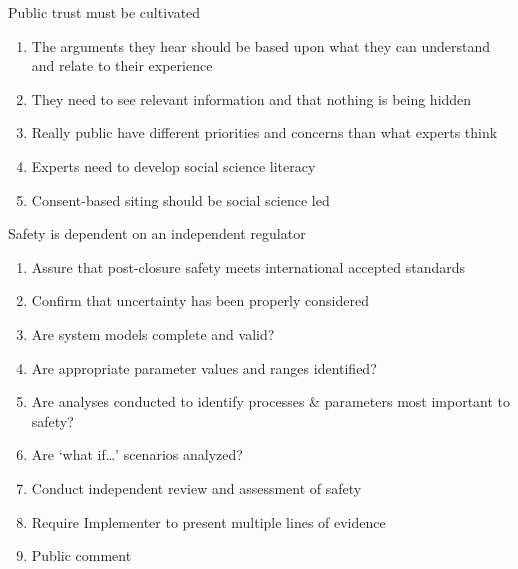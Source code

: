 \documentclass[aspectratio=1610,pdftex,dvipsnames,compress,xcolor={dvipsnames}]{beamer}
\begin{document}
\begin{frame}{Public trust must be cultivated}
    \begin{enumerate}[series=outerlist,topsep=0pt,itemsep=21pt,leftmargin=*,label=(\arabic*)]
        \item[]The arguments they hear should be based upon what they can understand and relate to their experience
        \item[]They need to see relevant information and that nothing is being hidden
        \item[]Really public have different priorities and concerns than what experts think
        \item[]Experts need to develop social science literacy
        \item[]Consent-based siting should be social science led
    \end{enumerate}
\end{frame}


\begin{frame}{Safety is dependent on an independent regulator}
    \begin{enumerate}[series=outerlist,topsep=0pt,itemsep=11pt,leftmargin=*,label=(\arabic*)]
        \item[]Assure that post-closure safety meets international accepted standards
        \item[]Confirm that uncertainty has been properly considered
        \item[]Are system models complete and valid?
        \item[]Are appropriate parameter values and ranges identified?
        \item[]Are analyses conducted to identify processes \& parameters most important to safety?
        \item[]Are `what if\ldots' scenarios analyzed?
        \item[]Conduct independent review and assessment of safety
        \item[]Require Implementer to present multiple lines of evidence
        \item[]Public comment
    \end{enumerate}
\end{frame}
\end{document}
